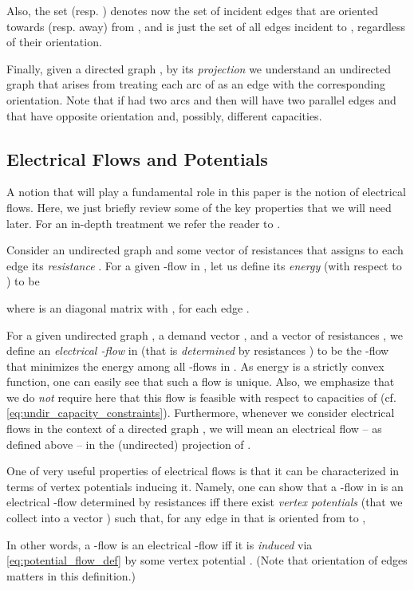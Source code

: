 \documentclass[11pt, letterpaper]{article}
\begin{document}
 Also, the set  (resp. ) denotes now the set of incident edges that are oriented towards (resp. away) from , and  is just the set of all edges incident to , regardless of their orientation. 

Finally, given a directed graph , by its {\em projection}  we understand an undirected graph that arises from treating each arc of  as an edge with the corresponding orientation. Note that if  had two arcs  and  then  will have two parallel edges  and  that have opposite orientation and, possibly, different capacities.   


\subsection{Electrical Flows and Potentials}

A notion that will play a fundamental role in this paper is the notion of electrical flows. Here, we just briefly review some of the key properties that we will need later. For an in-depth treatment we refer the reader to \cite{Bollobas98}. 

Consider an undirected graph  and some vector of resistances  that assigns to each edge  its {\em resistance} . For a given -flow  in , let us define its {\em energy} (with respect to )  to be

where  is an  diagonal matrix with , for each edge . 



For a given undirected graph , a demand vector , and a vector of resistances , we define an {\em electrical -flow} in  (that is {\em determined} by resistances ) to be the -flow that minimizes the energy  among all -flows in . As energy is a strictly convex function, one can easily see that such a flow is unique. Also, we emphasize that we do \emph{not} require here that this flow is feasible with respect to capacities of  (cf. \eqref{eq:undir_capacity_constraints}). Furthermore, whenever we consider electrical flows in the context of a directed graph , we will mean an electrical flow -- as defined above -- in the (undirected) projection  of .  


One of very useful properties of electrical flows is that it can be characterized in terms of vertex potentials inducing it. Namely, one can show that a -flow  in  is an electrical -flow determined by resistances  iff there exist {\em vertex potentials}  (that we collect into a vector ) such that, for any edge  in  that is oriented from  to ,

In other words, a -flow  is an electrical -flow iff it is {\em induced} via \eqref{eq:potential_flow_def} by some vertex potential . (Note that orientation of edges matters in this definition.)
\end{document}
